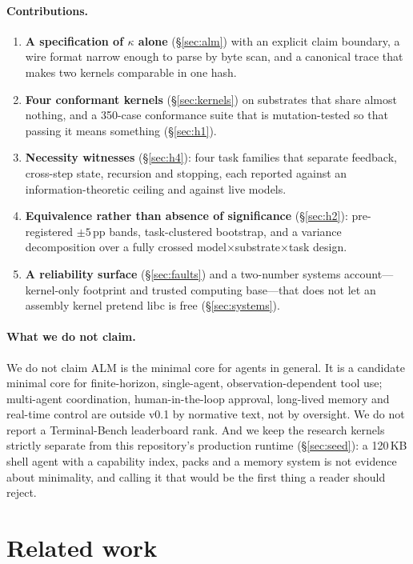\documentclass[11pt,a4paper]{article}
\begin{document}
\paragraph{Contributions.}
\begin{enumerate}
\item \textbf{A specification of $\kappa$ alone} (\S\ref{sec:alm}) with an
explicit claim boundary, a wire format narrow enough to parse by byte scan, and
a canonical trace that makes two kernels comparable in one hash.
\item \textbf{Four conformant kernels} (\S\ref{sec:kernels}) on substrates that
share almost nothing, and a 350-case conformance suite that is
mutation-tested so that passing it means something (\S\ref{sec:h1}).
\item \textbf{Necessity witnesses} (\S\ref{sec:h4}): four task families that
separate feedback, cross-step state, recursion and stopping, each reported
against an information-theoretic ceiling and against live models.
\item \textbf{Equivalence rather than absence of significance}
(\S\ref{sec:h2}): pre-registered $\pm5$\,pp bands, task-clustered bootstrap,
and a variance decomposition over a fully crossed
model$\times$substrate$\times$task design.
\item \textbf{A reliability surface} (\S\ref{sec:faults}) and a two-number
systems account---kernel-only footprint and trusted computing base---that does
not let an assembly kernel pretend libc is free (\S\ref{sec:systems}).
\end{enumerate}

\paragraph{What we do not claim.}
We do not claim ALM is the minimal core for agents in general. It is a
candidate minimal core for finite-horizon, single-agent, observation-dependent
tool use; multi-agent coordination, human-in-the-loop approval, long-lived
memory and real-time control are outside v0.1 by normative text, not by
oversight. We do not report a Terminal-Bench leaderboard rank. And we keep the
research kernels strictly separate from this repository's production runtime
(\S\ref{sec:seed}): a 120\,KB shell agent with a capability index, packs and a
memory system is not evidence about minimality, and calling it that would be
the first thing a reader should reject.

\section{Related work}
\end{document}

